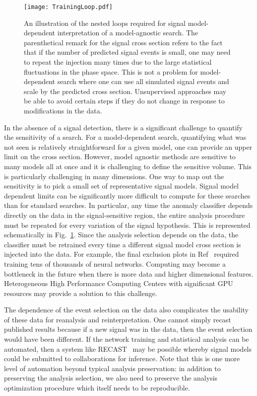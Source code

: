 \documentclass[a4paper,11pt]{article}
\begin{document}
\begin{figure}[h!]
\centering
\texttt{[image: TrainingLoop.pdf]}
\label{fig:trainingloop}
\caption{An illustration of the nested loops required for signal model-dependent interpretation of a model-agnostic search.  The parenthetical remark for the signal cross section refers to the fact that if the number of predicted signal events is small, one may need to repeat the injection many times due to the large statistical fluctuations in the phase space.  This is not a problem for model-dependent search where one can use all simulated signal events and scale by the predicted cross section.  Unsupervised approaches may be able to avoid certain steps if they do not change in response to modifications in the data.}
\end{figure}

In the absence of a signal detection, there is a significant challenge to quantify the sensitivity of a search.  For a model-dependent search, quantifying what was not seen is relatively straightforward for a given model, one can provide an upper limit on the cross section.  However, model agnostic methods are sensitive to many models all at once and it is challenging to define the sensitive volume.  This is particularly challenging in many dimensions.  One way to map out the sensitivity is to pick a small set of representative signal models.  Signal model dependent limits can be significantly more difficult to compute for these searches than for standard searches.  In particular, any time the anomaly classifier depends directly on the data in the signal-sensitive region, the entire analysis procedure must be repeated for every variation of the signal hypothesis.  This is represented schematically in Fig.~\ref{fig:trainingloop}.  Since the analysis selection depends on the data, the classifier must be retrained every time a different signal model cross section is injected into the data.  For example, the final exclusion plots in Ref~\cite{collaboration2020dijet} required training tens of thousands of neural networks.  Computing may become a bottleneck in the future when there is more data and higher dimensional features.  Heterogeneous High Performance Computing Centers with significant GPU resources may provide a solution to this challenge.

The dependence of the event selection on the data also complicates the usability of these data for reanalysis and reinterpretation.  One cannot simply recast published results because if a new signal was in the data, then the event selection would have been different.  If the network training and statistical analysis can be automated, then a system like RECAST~\cite{Cranmer:2010hk} may be possible whereby signal models could be submitted to collaborations for inference. Note that this is one more level of automation beyond typical analysis preservation: in addition to preserving the analysis selection, we also need to preserve the analysis optimization procedure which itself needs to be reproducible.
\end{document}
